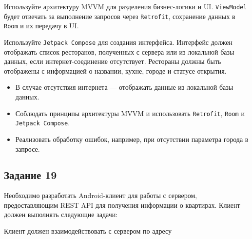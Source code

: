\documentclass[a4paper,12pt]{article}
\begin{document}
Используйте архитектуру MVVM для разделения бизнес-логики и UI. \texttt{ViewModel} будет отвечать за выполнение запросов через \texttt{Retrofit}, сохранение данных в \texttt{Room} и их передачу в UI.

Используйте \texttt{Jetpack Compose} для создания интерфейса. Интерфейс должен отображать список ресторанов, полученных с сервера или из локальной базы данных, если интернет-соединение отсутствует. Рестораны должны быть отображены с информацией о названии, кухне, городе и статусе открытия.

\begin{itemize}
  \item В случае отсутствия интернета — отображать данные из локальной базы данных.
  \item Соблюдать принципы архитектуры MVVM и использовать \texttt{Retrofit}, \texttt{Room} и \texttt{Jetpack Compose}.
  \item Реализовать обработку ошибок, например, при отсутствии параметра города в запросе.
\end{itemize}

\subsection*{Задание 19}

Необходимо разработать Android-клиент для работы с сервером, предоставляющим REST API для получения информации о квартирах. Клиент должен выполнять следующие задачи:

Клиент должен взаимодействовать с сервером по адресу 
\end{document}
